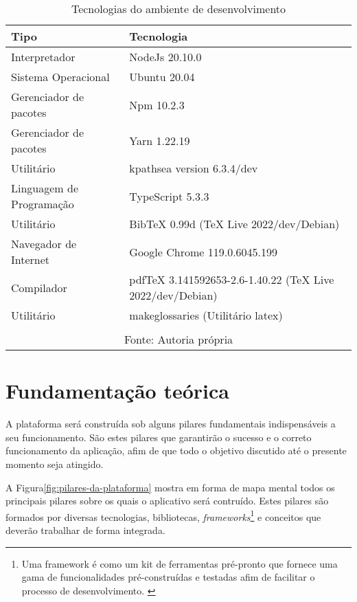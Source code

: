 \begin{table}[H]
    \centering
    \caption{Tecnologias do ambiente de desenvolvimento}
    \label{tbl:tecnologias-ambiente}
    \renewcommand{\arraystretch}{1.5}
    \begin{tabular}{p{6.4000cm} p{9.6000cm}}
        \hline
        \textbf{Tipo} & \textbf{Tecnologia} \\
        \hline
        Interpretador & NodeJs 20.10.0 \\
		Sistema Operacional & Ubuntu 20.04 \\
		Gerenciador de pacotes & Npm 10.2.3 \\
		Gerenciador de pacotes & Yarn 1.22.19 \\
		Utilitário & kpathsea version 6.3.4/dev \\
		Linguagem de Programação & TypeScript 5.3.3 \\
		Utilitário & BibTeX 0.99d (TeX Live 2022/dev/Debian) \\
		Navegador de Internet & Google Chrome 119.0.6045.199 \\
		Compilador & pdfTeX 3.141592653-2.6-1.40.22 (TeX Live 2022/dev/Debian) \\
		Utilitário & makeglossaries (Utilitário \acrshort{latex}) \\
        \hline
        \\\multicolumn{2}{c}{\fontsize{10pt}{12pt}Fonte: Autoria própria}
    \end{tabular}
\end{table}

\chapter{Fundamentação teórica}

A plataforma será construída sob alguns pilares fundamentais indispensáveis
a seu funcionamento. São estes pilares que garantirão o sucesso e o correto
funcionamento da aplicação, afim de que todo o objetivo discutido até o
presente momento seja atingido.

A
Figura\ref{fig:pilares-da-plataforma}
mostra em forma de mapa mental todos os principais pilares sobre os quais
o aplicativo será contruído. Estes pilares são formados por diversas
tecnologias, bibliotecas,
\textit{frameworks}\footnote{Uma framework é como um kit de ferramentas pré-pronto que fornece uma gama
    de funcionalidades pré-construídas e testadas afim de facilitar o processo
    de desenvolvimento. \cite{amazon-framework}
}
e conceitos que deverão trabalhar de forma integrada.

